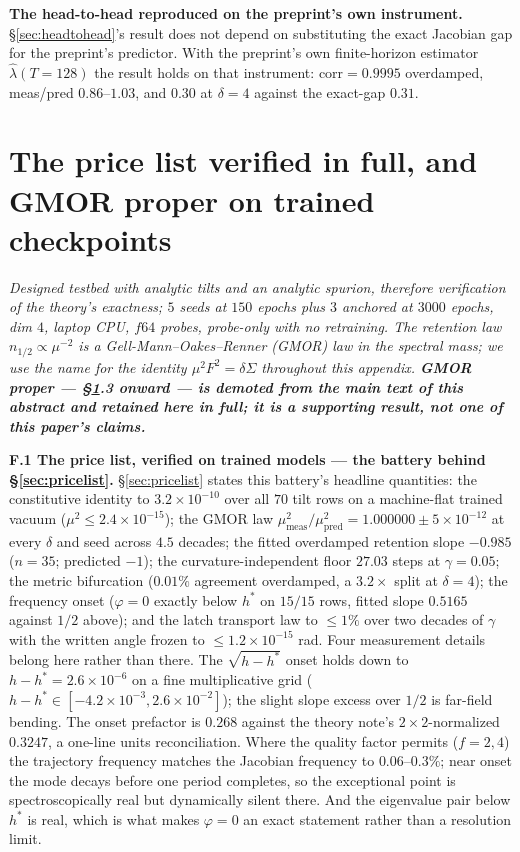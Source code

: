 \documentclass{article}
\begin{document}
\textbf{The head-to-head reproduced on the preprint's own instrument.} \S\ref{sec:headtohead}'s result does not depend on substituting the exact Jacobian gap for the preprint's predictor. With the preprint's own finite-horizon estimator $\hat\lambda(T{=}128)$ the result holds on that instrument: $\mathrm{corr}=0.9995$ overdamped, meas/pred $0.86$--$1.03$, and $0.30$ at $\delta=4$ against the exact-gap $0.31$.

\section{The price list verified in full, and GMOR proper on trained checkpoints}\label{app:gmor}

\emph{Designed testbed with analytic tilts and an analytic spurion, therefore verification of the theory's exactness; $5$ seeds at $150$ epochs plus $3$ anchored at $3000$ epochs, dim $4$, laptop CPU, $f64$ probes, probe-only with no retraining. The retention law $n_{1/2}\propto\mu^{-2}$ is a Gell-Mann--Oakes--Renner (GMOR) law in the spectral mass; we use the name for the identity $\mu^2F^2=\delta\Sigma$ throughout this appendix. \textbf{GMOR proper --- \S\ref{app:gmor}.3 onward --- is demoted from the main text of this abstract and retained here in full; it is a supporting result, not one of this paper's claims.}}

\textbf{F.1 The price list, verified on trained models --- the battery behind \S\ref{sec:pricelist}.} \S\ref{sec:pricelist} states this battery's headline quantities: the constitutive identity to $3.2{\times}10^{-10}$ over all $70$ tilt rows on a machine-flat trained vacuum ($\mu^2\le2.4{\times}10^{-15}$); the GMOR law $\mu^2_{\mathrm{meas}}/\mu^2_{\mathrm{pred}}=1.000000\pm5{\times}10^{-12}$ at every $\delta$ and seed across $4.5$ decades; the fitted overdamped retention slope $-0.985$ ($n=35$; predicted $-1$); the curvature-independent floor $27.03$ steps at $\gamma=0.05$; the metric bifurcation ($0.01\%$ agreement overdamped, a $3.2\times$ split at $\delta=4$); the frequency onset ($\varphi=0$ exactly below $h^*$ on $15/15$ rows, fitted slope $0.5165$ against $1/2$ above); and the latch transport law to $\le1\%$ over two decades of $\gamma$ with the written angle frozen to $\le1.2{\times}10^{-15}$ rad. Four measurement details belong here rather than there. The $\sqrt{h-h^*}$ onset holds down to $h-h^*=2.6{\times}10^{-6}$ on a fine multiplicative grid ($h-h^*\in[-4.2{\times}10^{-3},2.6{\times}10^{-2}]$); the slight slope excess over $1/2$ is far-field bending. The onset prefactor is $0.268$ against the theory note's $2\times2$-normalized $0.3247$, a one-line units reconciliation. Where the quality factor permits ($f=2,4$) the trajectory frequency matches the Jacobian frequency to $0.06$--$0.3\%$; near onset the mode decays before one period completes, so the exceptional point is spectroscopically real but dynamically silent there. And the eigenvalue pair below $h^*$ is real, which is what makes $\varphi=0$ an exact statement rather than a resolution limit.
\end{document}

